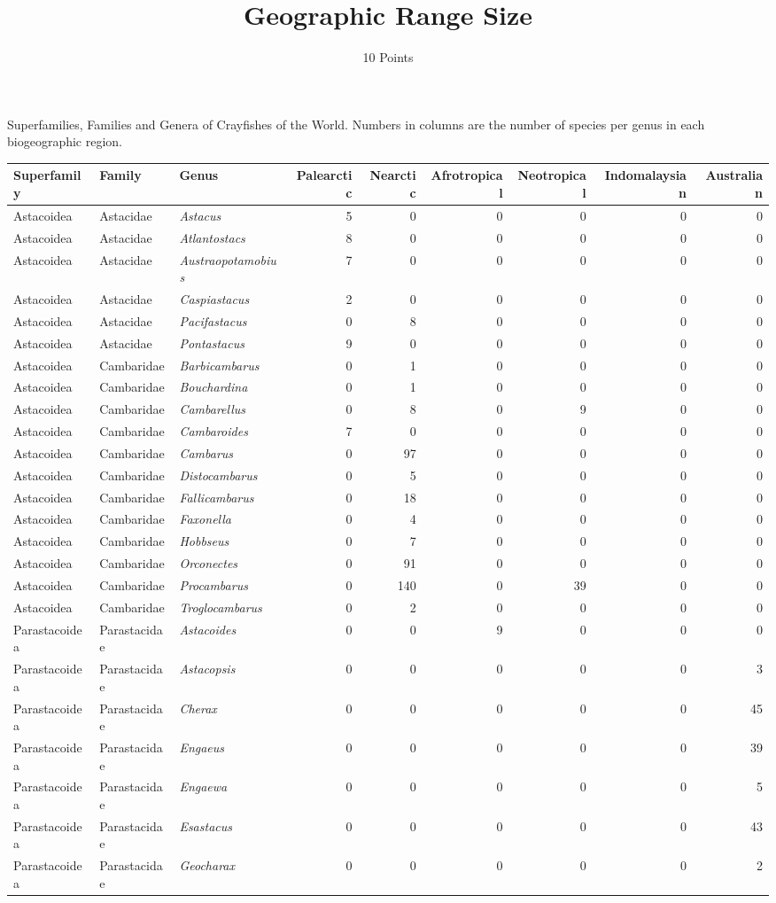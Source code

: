 \documentclass[11pt]{article}
\title{Geographic Range Size}
\author{10 Points}
\date{}                                           %
\begin{document}
Superfamilies, Families and Genera of Crayfishes of the World.  Numbers in columns are the number of species per genus in each biogeographic region.

\begin{longtable}[l]{@{}lllrrrrrr@{}}
\toprule
Superfamily & Family & Genus &
Palearctic & Nearctic & Afrotropical &
Neotropical & Indomalaysian &
Australian\tabularnewline
\midrule
\endhead
Astacoidea & Astacidae & \emph{Astacus} & 5 & 0 & 0 & 0 & 0 &
0\tabularnewline
Astacoidea & Astacidae & \emph{Atlantostacs} & 8 & 0 & 0 & 0 & 0 &
0\tabularnewline
Astacoidea & Astacidae & \emph{Austraopotamobius} & 7 & 0 & 0 & 0 & 0 &
0\tabularnewline
Astacoidea & Astacidae & \emph{Caspiastacus} & 2 & 0 & 0 & 0 & 0 &
0\tabularnewline
Astacoidea & Astacidae & \emph{Pacifastacus} & 0 & 8 & 0 & 0 & 0 &
0\tabularnewline
Astacoidea & Astacidae & \emph{Pontastacus} & 9 & 0 & 0 & 0 & 0 &
0\tabularnewline
Astacoidea & Cambaridae & \emph{Barbicambarus} & 0 & 1 & 0 & 0 & 0 &
0\tabularnewline
Astacoidea & Cambaridae & \emph{Bouchardina} & 0 & 1 & 0 & 0 & 0 &
0\tabularnewline
Astacoidea & Cambaridae & \emph{Cambarellus} & 0 & 8 & 0 & 9 & 0 &
0\tabularnewline
Astacoidea & Cambaridae & \emph{Cambaroides} & 7 & 0 & 0 & 0 & 0 &
0\tabularnewline
Astacoidea & Cambaridae & \emph{Cambarus} & 0 & 97 & 0 & 0 & 0 &
0\tabularnewline
Astacoidea & Cambaridae & \emph{Distocambarus} & 0 & 5 & 0 & 0 & 0 &
0\tabularnewline
Astacoidea & Cambaridae & \emph{Fallicambarus} & 0 & 18 & 0 & 0 & 0 &
0\tabularnewline
Astacoidea & Cambaridae & \emph{Faxonella} & 0 & 4 & 0 & 0 & 0 &
0\tabularnewline
Astacoidea & Cambaridae & \emph{Hobbseus} & 0 & 7 & 0 & 0 & 0 &
0\tabularnewline
Astacoidea & Cambaridae & \emph{Orconectes} & 0 & 91 & 0 & 0 & 0 &
0\tabularnewline
Astacoidea & Cambaridae & \emph{Procambarus} & 0 & 140 & 0 & 39 & 0 &
0\tabularnewline
Astacoidea & Cambaridae & \emph{Troglocambarus} & 0 & 2 & 0 & 0 & 0 &
0\tabularnewline
Parastacoidea & Parastacidae & \emph{Astacoides} & 0 & 0 & 9 & 0 & 0 &
0\tabularnewline
Parastacoidea & Parastacidae & \emph{Astacopsis} & 0 & 0 & 0 & 0 & 0 &
3\tabularnewline
Parastacoidea & Parastacidae & \emph{Cherax} & 0 & 0 & 0 & 0 & 0 &
45\tabularnewline
Parastacoidea & Parastacidae & \emph{Engaeus} & 0 & 0 & 0 & 0 & 0 &
39\tabularnewline
Parastacoidea & Parastacidae & \emph{Engaewa} & 0 & 0 & 0 & 0 & 0 &
5\tabularnewline
Parastacoidea & Parastacidae & \emph{Esastacus} & 0 & 0 & 0 & 0 & 0 &
43\tabularnewline
Parastacoidea & Parastacidae & \emph{Geocharax} & 0 & 0 & 0 & 0 & 0 &
2\tabularnewline

\end{longtable}
\end{document}
